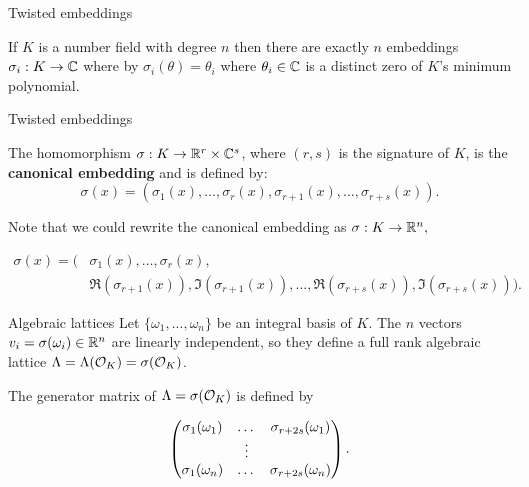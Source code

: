 \documentclass[notheorems, bigger]{beamer}
\begin{document}
\begin{frame}[label={sec:org50493c3}]{Twisted embeddings}
\begin{theorem}
  If $K$ is a number field with degree $n$ then there are
  exactly $n$ embeddings $\sigma_i : K \rightarrow \mathbb{C}$ where by $\sigma_i(\theta) =
  \theta_i$ where $\theta_i \in \mathbb{C}$ is a distinct zero of $K$'s
  minimum polynomial.
\end{theorem}
\end{frame}

\begin{frame}[label={sec:org2507af9}]{Twisted embeddings}
\begin{text}
  The homomorphism $\sigma: K \rightarrow \mathbb{R}^r \times \mathbb{C}^s$, where $(r,s)$ is the signature of $K$, is the \textbf{canonical embedding} and is defined by:
  \[
  \sigma(x) = \left(\sigma_1(x), \ldots , \sigma_r(x), \sigma_{r+1}(x), \ldots, \sigma_{r+s}(x) \right).
\]

  Note that we could rewrite the canonical embedding as $\sigma : K \rightarrow \mathbb{R}^n,$

  \begin{align*}
    \sigma(x) = (& \sigma_1(x), \ldots , \sigma_r(x), \\
            & \Re(\sigma_{r+1}(x)), \Im(\sigma_{r+1}(x)), \ldots, \Re(\sigma_{r+s}(x)), \Im(\sigma_{r+s}(x)) ).
  \end{align*}

\end{text}
\end{frame}
\begin{frame}[label={sec:org8b8868f}]{Algebraic lattices}
Let \(\{\omega_1,...,\omega_n\}\) be an integral basis of \(K\). The \(n\) vectors \(v_i = \sigma(\omega_i)
\in \mathbb{R}^n\) are linearly independent, so they define a full rank algebraic lattice
\(\Lambda = \Lambda(\mathcal{O}_K) = \sigma(\mathcal{O}_K)\).

The generator matrix of \(\Lambda = \sigma(\mathcal{O}_K)\) is defined by

\begin{equation*}
  \label{definition:gen-matrix-alg-lattices}
  \begin{pmatrix}
    \sigma_1(\omega_1) & $\dots$ &  \sigma_{r+2s}(\omega_1) \\
    & \vdots & \\
    \sigma_1(\omega_n) & $\dots$ & \sigma_{r+2s}(\omega_n) \\
  \end{pmatrix}.  
\end{equation*}
\end{frame}
\end{document}
